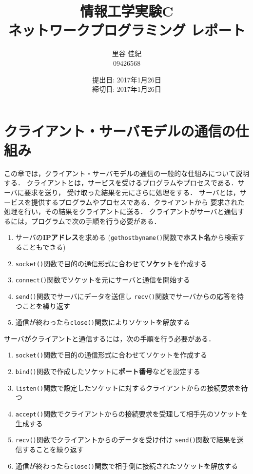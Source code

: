 \documentclass[a4j,10pt]{jarticle}
\title{ %
情報工学実験C%
\\
{\Large ネットワークプログラミング レポート} %
}
\author{ %
里谷 佳紀 %
\\
09426568 %
}
\date{ %
提出日: 2017年1月26日\\%
締切日: 2017年1月26日%
}
\begin{document}
\maketitle

\section{クライアント・サーバモデルの通信の仕組み}
この章では，クライアント・サーバモデルの通信の一般的な仕組みについて説明する．
クライアントとは，サービスを受けるプログラムやプロセスである．サーバに要求を送り，
受け取った結果を元にさらに処理をする．
サーバとは，サービスを提供するプログラムやプロセスである．クライアントから
要求された処理を行い，その結果をクライアントに送る．
クライアントがサーバと通信するには，プログラムで次の手順を行う必要がある．
\begin{enumerate}
\item サーバの\textbf{IPアドレス}を求める
  (\verb|gethostbyname()|関数で\textbf{ホスト名}から検索することもできる)
\item \verb|socket()|関数で目的の通信形式に合わせて\textbf{ソケット}を作成する
\item \verb|connect()|関数でソケットを元にサーバと通信を開始する
\item \verb|send()|関数でサーバにデータを送信し
  \verb|recv()|関数でサーバからの応答を待つことを繰り返す
\item 通信が終わったら\verb|close()|関数によりソケットを解放する
\end{enumerate}
サーバがクライアントと通信するには，次の手順を行う必要がある．
\begin{enumerate}
\item \verb|socket()|関数で目的の通信形式に合わせてソケットを作成する
\item \verb|bind()|関数で作成したソケットに\textbf{ポート番号}などを設定する
\item \verb|listen()|関数で設定したソケットに対するクライアントからの接続要求を待つ
\item \verb|accept()|関数でクライアントからの接続要求を受理して相手先のソケットを
  生成する
\item \verb|recv()|関数でクライアントからのデータを受け付け
  \verb|send()|関数で結果を送信することを繰り返す
\item 通信が終わったら\verb|close()|関数で相手側に接続されたソケットを解放する
\end{enumerate}
\end{document}
